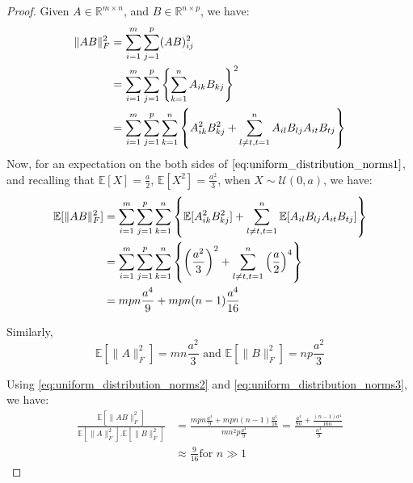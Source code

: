 \documentclass[onefignum,onetabnum]{siamart171218}
\DeclarePairedDelimiter\norm{\lVert}{\rVert}
\begin{document}
\begin{proof}
    Given $A \in \mathbb{R}^{m\times n}$, and $B \in \mathbb{R}^{n\times p}$, we have: \begin{align}   \|AB\|^2_F&=\sum_{i=1}^m\sum_{j=1}^p(AB)_{ij}^2\notag\\
    &=\sum_{i=1}^m \sum_{j=1}^{p}\left\{\sum_{k=1}^n A_{ik}B_{kj}\right\}^2\notag\\
    &=\sum_{i=1}^m\sum_{j=1}^p\sum_{k=1}^n\left\{A_{ik}^2 B_{kj}^2 + \sum_{l\ne t,t=1}^nA_{il}B_{lj}A_{it}B_{tj}\right\}\label{eq:uniform_distribution_norms1}
    \end{align}
Now, for an expectation on the both sides of $\eqref{eq:uniform_distribution_norms1}$, and recalling that $\mathbb{E}[X]=\frac{a}{2}$, $\mathbb{E}[X^2]=\frac{a^2}{3}$, when $X \sim \mathcal{U}(0,a)$, we have: 
\begin{align}
    \mathbb{E}[\|AB\|_F^2] &=\sum_{i=1}^m\sum_{j=1}^p \sum_{k=1}^n\left\{\mathbb{E}[A_{ik}^2 B_{kj}^2] + \sum_{l\ne t, t=1}^n \mathbb{E}[A_{il}B_{lj}A_{it}B_{tj}]\right\}\notag\\
    &=\sum_{i=1}^m\sum_{j=1}^p\sum_{k=1}^n \left\{\left(\frac{a^2}{3}\right)^2+\sum_{l\ne t,t=1}^n\left(\frac{a}{2}\right)^4\right\} \notag\\ 
    &=mpn\frac{a^4}{9}+mpn(n-1)\frac{a^4}{16}\label{eq:uniform_distribution_norms2}
\end{align}

Similarly,
\begin{equation}
    \mathbb{E}[\|A\|_F^2] = mn\frac{a^2}{3} \text{ and }
    \mathbb{E}[\|B\|_F^2] = np\frac{a^2}{3}\label{eq:uniform_distribution_norms3}
\end{equation}

Using \eqref{eq:uniform_distribution_norms2} and \eqref{eq:uniform_distribution_norms3}, we have:
\begin{align}
    \frac{\mathbb{E}[\|AB\|_F^2]}{\mathbb{E}[\|A\|_F^2].\mathbb{E}[\|B\|_F^2]}&=\frac{mpn\frac{a^4}{9}+mpn(n-1)\frac{a^4}{16}}{mn^2p\frac{a^4}{9}} 
    = \frac{\frac{a^4}{9n}+\frac{(n-1)a^4}{16n}}{\frac{a^4}{9}} \\
    & \approx \frac{9}{16}\text{for } n \gg 1
\end{align}

\end{proof}
\end{document}
